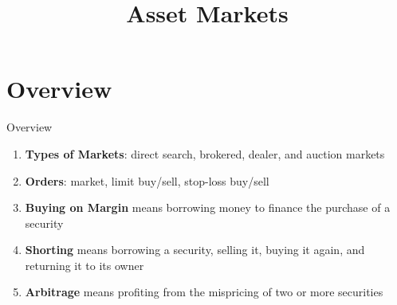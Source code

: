\documentclass{beamer}
\title{Asset Markets}
\begin{document}
\maketitle
\section{Overview}
\begin{frame}{Overview}
	\begin{enumerate}
		\item\textbf{Types of Markets}: direct search, brokered, dealer, and auction markets
		\item\textbf{Orders}: market, limit buy/sell, stop-loss buy/sell
		\item\textbf{Buying on Margin} means borrowing money to finance the purchase of a security
		\item\textbf{Shorting} means borrowing a security, selling it, buying it again, and returning it to its owner
		\item\textbf{Arbitrage} means profiting from the mispricing of two or more securities
	\end{enumerate}
\end{frame}

\end{document}
